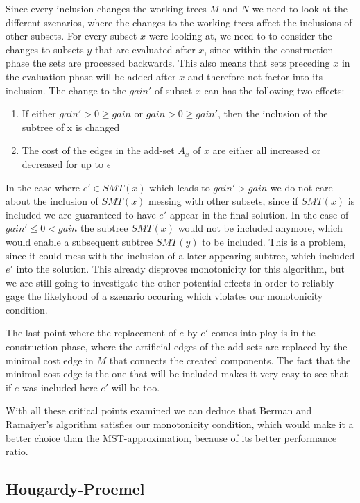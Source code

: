 Since every inclusion changes the working trees $M$ and $N$ we need to look at the different szenarios, where the changes to the working trees affect the inclusions of other subsets. For every subset $x$ were looking at, we need to to consider the changes to subsets $y$ that are evaluated after $x$, since within the construction phase the sets are processed backwards. This also means that sets preceding $x$ in the evaluation phase will be added after $x$ and therefore not factor into its inclusion.
The change to the $gain'$ of subset $x$ can has the following two effects:
\begin{enumerate}
\item If either $gain'>0\geq gain$ or $gain>0\geq gain'$, then the inclusion of the subtree of x is changed
\item The cost of the edges in the add-set $A_x$ of $x$ are either all increased or decreased for up to $\epsilon$
\end{enumerate}
In the case where $e'\in SMT(x)$ which leads to $gain'>gain$ we do not care about the inclusion of $SMT(x)$ messing with other subsets, since if $SMT(x)$ is included we are guaranteed to have $e'$ appear in the final solution. In the case of $gain'\leq 0<gain$ the subtree $SMT(x)$ would not be included anymore, which would enable a subsequent subtree $SMT(y)$ to be included. This is a problem, since it could mess with the inclusion of a later appearing subtree, which included $e'$ into the solution. This already disproves monotonicity for this algorithm, but we are still going to investigate the other potential effects in order to reliably gage the likelyhood of a szenario occuring which violates our monotonicity condition.
  
The last point where the replacement of $e$ by $e'$ comes into play is in the construction phase, where the artificial edges of the add-sets are replaced by the minimal cost edge in $M$ that connects the created components. The fact that the minimal cost edge is the one that will be included makes it very easy to see that if $e$ was included here $e'$ will be too.

With all these critical points examined we can deduce that Berman and Ramaiyer's algorithm satisfies our monotonicity condition, which would make it a better choice than the MST-approximation, because of its better performance ratio. 
\subsection{Hougardy-Proemel}

